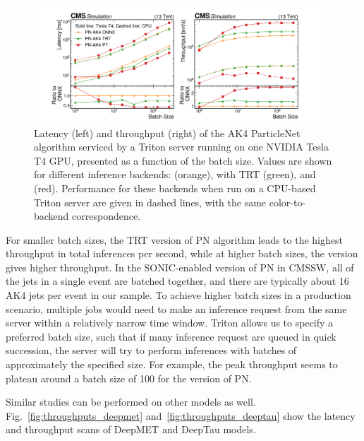 \begin{figure}[ht]
    \centering
    \includegraphics[width=0.98\textwidth]{plots/latencies_throughputs_pn.pdf}
    \caption{Latency (left) and throughput (right) of the AK4 ParticleNet algorithm serviced by a Triton server running on one NVIDIA Tesla T4 GPU, presented as a function of the batch size. Values are shown for different inference backends: \ONNX (orange), \ONNX with TRT (green), and \PYTORCH (red). Performance for these backends when run on a CPU-based Triton server are given in dashed lines, with the same color-to-backend correspondence.}%
    \label{fig:throughputs_pn}
\end{figure}

For smaller batch sizes, the TRT version of PN algorithm leads to the highest throughput in total inferences per second, while at higher batch sizes, the \PYTORCH version gives higher throughput. In the SONIC-enabled version of PN in CMSSW, all of the jets in a single event are batched together, and there are typically about 16 AK4 jets per event in our \ttbar sample. To achieve higher batch sizes in a production scenario, multiple jobs would need to make an inference request from the same server within a relatively narrow time window. Triton allows us to specify a preferred batch size, such that if many inference request are queued in quick succession, the server will try to perform inferences with batches of approximately the specified size. For example, the peak throughput seems to plateau around a batch size of 100 for the \PYTORCH version of PN.%

Similar studies can be performed on other models as well. Fig.~\ref{fig:throughputs_deepmet} and~\ref{fig:throughputs_deeptau} show the latency and throughput scans of DeepMET and DeepTau models. 

